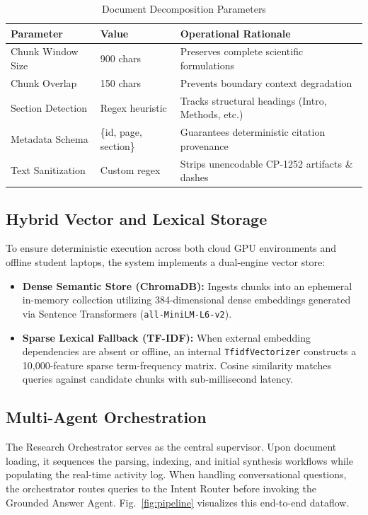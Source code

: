 \documentclass[conference]{IEEEtran}
\begin{document}
\begin{table}[!htbp]
\caption{Document Decomposition Parameters}
\label{tab:chunking_params}
\centering
\footnotesize
\setlength{\tabcolsep}{3pt}
\begin{tabularx}{\columnwidth}{@{}l l Y@{}}
\toprule
\textbf{Parameter} & \textbf{Value} & \textbf{Operational Rationale} \\
\midrule
Chunk Window Size & 900 chars & Preserves complete scientific formulations \\
Chunk Overlap & 150 chars & Prevents boundary context degradation \\
Section Detection & Regex heuristic & Tracks structural headings (Intro, Methods, etc.) \\
Metadata Schema & \{id, page, section\} & Guarantees deterministic citation provenance \\
Text Sanitization & Custom regex & Strips unencodable CP-1252 artifacts \& dashes \\
\bottomrule
\end{tabularx}
\end{table}

\subsection{Hybrid Vector and Lexical Storage}
To ensure deterministic execution across both cloud GPU environments and offline student laptops, the system implements a dual-engine vector store:
\begin{itemize}
    \item \textbf{Dense Semantic Store (ChromaDB):} Ingests chunks into an ephemeral in-memory collection utilizing 384-dimensional dense embeddings generated via Sentence Transformers \cite{reimers2019sentence} (\texttt{all-MiniLM-L6-v2}).
    \item \textbf{Sparse Lexical Fallback (TF-IDF):} When external embedding dependencies are absent or offline, an internal \texttt{TfidfVectorizer} constructs a 10,000-feature sparse term-frequency matrix. Cosine similarity matches queries against candidate chunks with sub-millisecond latency.
\end{itemize}

\subsection{Multi-Agent Orchestration}
The Research Orchestrator serves as the central supervisor. Upon document loading, it sequences the parsing, indexing, and initial synthesis workflows while populating the real-time activity log. When handling conversational questions, the orchestrator routes queries to the Intent Router before invoking the Grounded Answer Agent. Fig.~\ref{fig:pipeline} visualizes this end-to-end dataflow.
\end{document}
